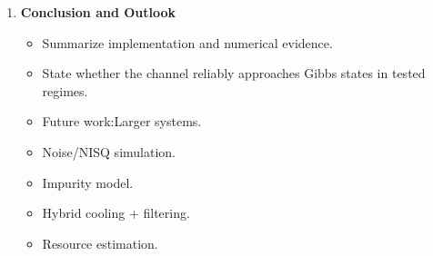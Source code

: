 \documentclass[11pt,a4paper]{article}
\begin{document}
\begin{itemize}
\begin{enumerate}
    \item \textbf{Conclusion and Outlook}
    \begin{itemize}
      \item Summarize implementation and numerical evidence.
      \item State whether the channel reliably approaches Gibbs states in tested regimes.
      \item Future work:Larger systems.
      \item Noise/NISQ simulation.
      \item Impurity model.
      \item Hybrid cooling + filtering.
      \item Resource estimation.
    \end{itemize}
  \end{enumerate}
\end{itemize}
\end{document}
